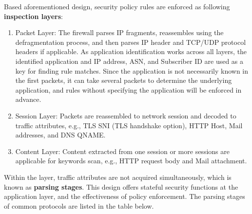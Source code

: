 Based aforementioned design, security policy rules are enforced as following \textbf{inspection layers}:
\begin{description}[leftmargin=0pt,itemindent=0em,itemsep=0.5ex]
    \item
    \begin{enumerate}
        \item 	Packet Layer: The firewall parses IP fragments, reassembles using the defragmentation process, and then parses IP header and TCP/UDP protocol headers if applicable. As application identification works across all layers, the identified application and IP address, ASN, and Subscriber ID are used as a key for finding rule matches. Since the application is not necessarily known in the first packets, it can take several packets to determine the underlying application, and rules without specifying the application will be enforced in advance.
        \item 	Session Layer: Packets are reassembled to network session and decoded to traffic attributes, e.g., TLS SNI (TLS handshake option), HTTP Host, Mail addresses, and DNS QNAME.
        \item 	Content Layer: Content extracted from one session or more sessions are applicable for keywords scan, e.g., HTTP request body and Mail attachment.
    \end{enumerate}
 \end{description}
Within the layer, traffic attributes are not acquired simultaneously, which is known as \textbf{parsing stages}. This design offers stateful security functions at the application layer, 
and the effectiveness of policy enforcement. The parsing stages of common protocols are listed in the table below.\\
